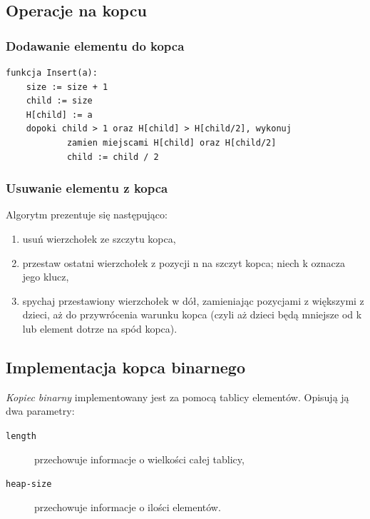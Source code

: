 \documentclass[12pt,a4paper]{article}
\begin{document}
\subsection{Operacje na kopcu}

\subsubsection{Dodawanie elementu do kopca}

\begin{lstlisting}[caption=Pseudokod algorytmu dodawania elementów do kopca]
funkcja Insert(a):
    size := size + 1
    child := size
    H[child] := a
    dopoki child > 1 oraz H[child] > H[child/2], wykonuj
            zamien miejscami H[child] oraz H[child/2]
            child := child / 2
\end{lstlisting}

\subsubsection{Usuwanie elementu z kopca}

Algorytm prezentuje się następująco:

\begin{enumerate}
	\item usuń wierzchołek ze szczytu kopca,
	\item przestaw ostatni wierzchołek z pozycji n na szczyt kopca; niech k oznacza jego klucz,
	\item spychaj przestawiony wierzchołek w dół, zamieniając pozycjami z większymi z dzieci, aż do przywrócenia warunku kopca (czyli aż dzieci będą mniejsze od k lub element dotrze na spód kopca).
\end{enumerate}

\subsection{Implementacja kopca binarnego}

\textit{Kopiec binarny} implementowany jest za pomocą tablicy elementów. Opisują ją dwa parametry: 

\begin{description}
	\item [\texttt{length}] przechowuje informacje o wielkości całej tablicy, 
	\item [\texttt{heap-size}] przechowuje informacje o ilości elementów. 
\end{description}
\end{document}
